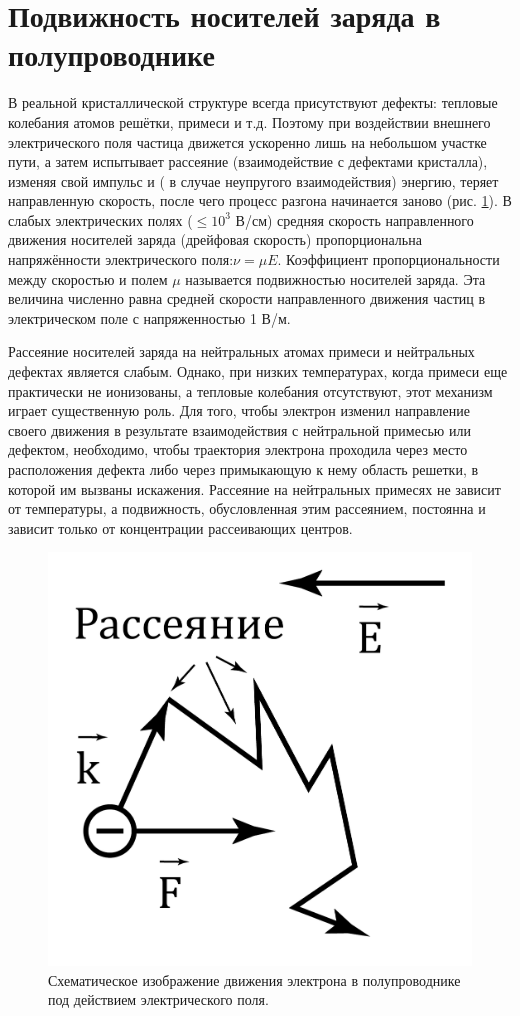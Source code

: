\section{Подвижность носителей заряда в полупроводнике}
В реальной кристаллической структуре всегда присутствуют дефекты: тепловые колебания атомов решётки, примеси и т.д.
Поэтому при воздействии внешнего электрического поля частица движется ускоренно лишь на небольшом участке пути, а затем
испытывает рассеяние (взаимодействие с дефектами кристалла), изменяя свой импульс и ( в случае неупругого
взаимодействия) энергию, теряет направленную скорость, после чего процесс разгона начинается заново (рис. \ref{fig:3.1}). В слабых
электрических полях ($\leq 10^3$ В/см) средняя скорость направленного движения носителей заряда (дрейфовая скорость)
пропорциональна напряжённости электрического поля:$\nu = \mu E$. Коэффициент пропорциональности между скоростью и полем $\mu$
называется подвижностью носителей заряда. Эта величина численно равна средней скорости направленного движения частиц в
электрическом поле с напряженностью 1 В/м. 

Рассеяние носителей заряда на нейтральных атомах примеси и нейтральных дефектах является слабым. Однако, при низких
температурах, когда примеси еще практически не ионизованы, а тепловые колебания отсутствуют, этот механизм играет
существенную роль. Для того, чтобы электрон изменил направление своего движения в результате взаимодействия с
нейтральной примесью или дефектом, необходимо, чтобы траектория электрона проходила через место расположения дефекта
либо через примыкающую к нему область решетки, в которой им вызваны искажения. Рассеяние на нейтральных примесях не
зависит от температуры, а подвижность, обусловленная этим рассеянием, постоянна и зависит только от концентрации
рассеивающих центров.

\begin{figure}
	\centering
	\includegraphics[width = .9\linewidth]{img/31}
	\caption{Схематическое изображение движения электрона в полупроводнике под действием электрического поля.}
	\label{fig:3.1}
\end{figure}

